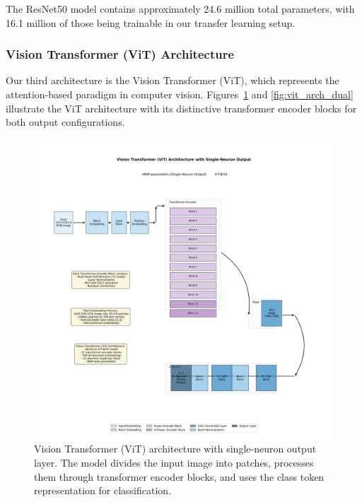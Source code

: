 The ResNet50 model contains approximately 24.6 million total parameters, with 16.1 million of those being trainable in our transfer learning setup.

\subsubsection{Vision Transformer (ViT) Architecture}

Our third architecture is the Vision Transformer (ViT), which represents the attention-based paradigm in computer vision. Figures~\ref{fig:vit_arch_single} and \ref{fig:vit_arch_dual} illustrate the ViT architecture with its distinctive transformer encoder blocks for both output configurations.

\begin{figure}[htbp]
\centering
\includegraphics[width=\textwidth]{figures/vit_1neuron_architecture.png}
\caption{Vision Transformer (ViT) architecture with single-neuron output layer. The model divides the input image into patches, processes them through transformer encoder blocks, and uses the class token representation for classification.}
\label{fig:vit_arch_single}
\end{figure}

